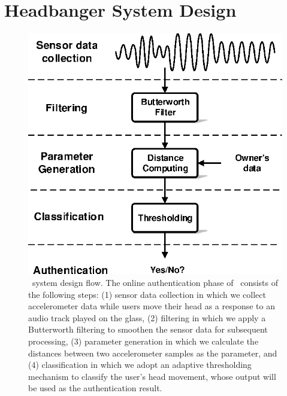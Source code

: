 \section{Headbanger System Design}
\label{sec:design}

\begin{figure}[t]
\centering

\includegraphics[width=0.75\columnwidth]{figure/system.eps}


\caption{\systemname~system design flow. The online authentication phase of \systemname~consists of the following steps: (1) sensor data collection in which we collect accelerometer data while users move their head as a response to an audio track played on the glass, (2) filtering in which we apply a Butterworth filtering to smoothen the sensor data for subsequent processing, (3) parameter generation in which we calculate the distances between two accelerometer samples as the parameter, and (4) classification in which we adopt an adaptive thresholding mechanism to classify the user's head movement, whose output will be used as the authentication result.}
\label{fig:sysarch}
\end{figure}


